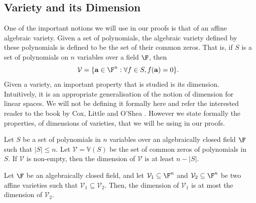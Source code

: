 	
\subsection{Variety and its Dimension}
One of the important notions we will use in our proofs is that of an affine algebraic variety. Given a set of polynomials, the algebraic variety defined by these polynomials is defined to be the set of their common zeros. That is, if $S$ is a set of polynomials on $n$ variables over a field $\F$, then
\[\mathcal V=\{\mathbf a\in\F^n:\forall f\in S,f(\mathbf a)=0\}.\]
Given a variety, an important property that is studied is its dimension. Intuitively, it is an appropriate generalisation of the notion of dimension for linear spaces. We will not be defining it formally here and refer the interested reader to the book by Cox, Little and O'Shea \cite{CLO}. However we state formally the properties, of dimensions of varieties, that we will be using in our proofs.
\begin{lemma}\label{lem:dimlower}
Let $S$ be a set of polynomials in $n$ variables over an algebraically closed field $\F$ such that $|S|\le n$. Let $\mathcal V=\mathbb V(S)$ be the set of common zeros of polynomials in $S$. If $\mathcal V$ is non-empty, then the dimension of $\mathcal V$ is at least $n-|S|$.
\end{lemma}
\begin{lemma}\label{lem:diminclusion}
Let $\F$ be an algebraically closed field, and let $\mathcal V_1\subseteq\F^n$ and $\mathcal V_2\subseteq\F^n$ be two affine varieties such that $\mathcal V_1\subseteq\mathcal V_2$. Then, the dimension of $\mathcal V_1$ is at most the dimension of $\mathcal V_2$.
\end{lemma}
